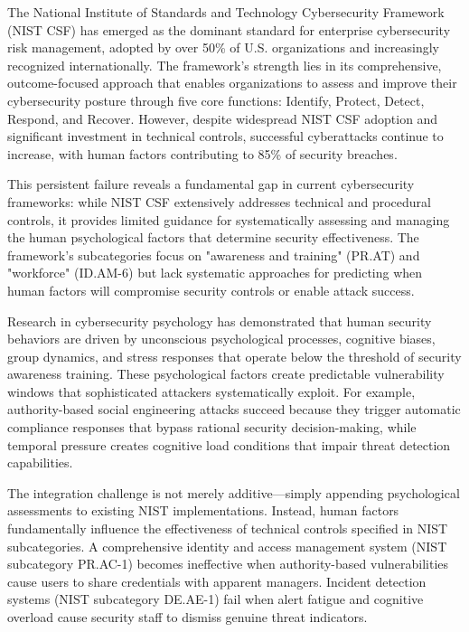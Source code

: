 \documentclass[10pt, twocolumn]{article}
\begin{document}
The National Institute of Standards and Technology Cybersecurity Framework (NIST CSF) has emerged as the dominant standard for enterprise cybersecurity risk management, adopted by over 50\% of U.S. organizations and increasingly recognized internationally\cite{nist2023adoption}. The framework's strength lies in its comprehensive, outcome-focused approach that enables organizations to assess and improve their cybersecurity posture through five core functions: Identify, Protect, Detect, Respond, and Recover. However, despite widespread NIST CSF adoption and significant investment in technical controls, successful cyberattacks continue to increase, with human factors contributing to 85\% of security breaches\cite{verizon2024}.

This persistent failure reveals a fundamental gap in current cybersecurity frameworks: while NIST CSF extensively addresses technical and procedural controls, it provides limited guidance for systematically assessing and managing the human psychological factors that determine security effectiveness. The framework's subcategories focus on "awareness and training" (PR.AT) and "workforce" (ID.AM-6) but lack systematic approaches for predicting when human factors will compromise security controls or enable attack success.

Research in cybersecurity psychology has demonstrated that human security behaviors are driven by unconscious psychological processes, cognitive biases, group dynamics, and stress responses that operate below the threshold of security awareness training\cite{canale2024}. These psychological factors create predictable vulnerability windows that sophisticated attackers systematically exploit. For example, authority-based social engineering attacks succeed because they trigger automatic compliance responses that bypass rational security decision-making, while temporal pressure creates cognitive load conditions that impair threat detection capabilities.

The integration challenge is not merely additive—simply appending psychological assessments to existing NIST implementations. Instead, human factors fundamentally influence the effectiveness of technical controls specified in NIST subcategories. A comprehensive identity and access management system (NIST subcategory PR.AC-1) becomes ineffective when authority-based vulnerabilities cause users to share credentials with apparent managers. Incident detection systems (NIST subcategory DE.AE-1) fail when alert fatigue and cognitive overload cause security staff to dismiss genuine threat indicators.
\end{document}
